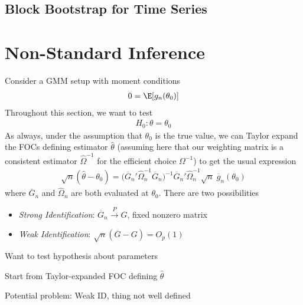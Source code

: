 \documentclass[12pt]{article}
\theoremstyle{plain}
\theoremstyle{definition}
\theoremstyle{remark}
\newcommand{\ra}{\rightarrow}
\newcommand{\pto}{\xrightarrow{P}}
\begin{document}
\clearpage
\subsection{Block Bootstrap for Time Series}


\clearpage
\section{Non-Standard Inference}



Consider a GMM setup with moment conditions
\begin{align*}
  0 = \E[g_n(\theta_0)]
\end{align*}
Throughout this section, we want to test
\begin{align*}
  H_0: \theta=\theta_0
\end{align*}
As always, under the assumption that $\theta_0$ is the true value, we
can Taylor expand the FOCs defining estimator $\hat{\theta}$
(assuming here that our weighting matrix is a consistent estimator
$\hat{\Omega}^{-1}$ for the efficient choice $\Omega^{-1}$)
to get the usual expression
\begin{align*}
  \sqrt{n}(\hat{\theta}-\theta_0)
  =
  \big(\overline{G}_n'\hat{\Omega}^{-1}_n\overline{G}_n\big)^{-1}
  \overline{G}_n'\hat{\Omega}^{-1}_n
  \sqrt{n}\;\overline{g}_n(\theta_0)
\end{align*}
where $\overline{G}_n$ and $\hat{\Omega}_n$ are both evaluated at
$\theta_0$.
There are two possibilities
\begin{itemize}
  \item
    \emph{Strong Identification}:
    $\overline{G}_n\pto G$, fixed nonzero matrix
  \item
    \emph{Weak Identification}:
    $\sqrt{n}(\overline{G}-G)=O_p(1)$
\end{itemize}

Want to test hypothesis about parameters

Start from Taylor-expanded FOC defining $\hat{\theta}$

Potential problem: Weak ID, thing not well defined
\end{document}
